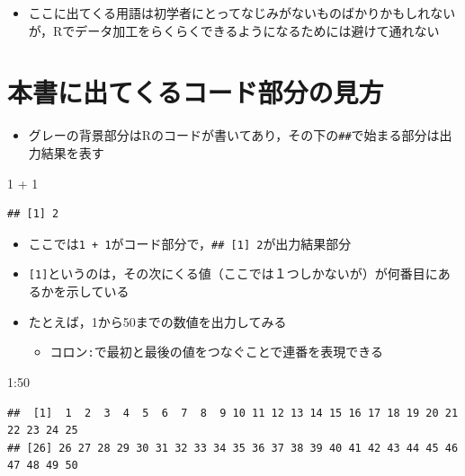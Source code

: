 \documentclass[
  xelatex,ja=standard, b5paper]{bxjsbook}
\newenvironment{Shaded}{\begin{snugshade}}{\end{snugshade}}
\newcommand{\DecValTok}[1]{\textcolor[rgb]{0.00,0.00,0.81}{#1}}
\newcommand{\SpecialCharTok}[1]{\textcolor[rgb]{0.00,0.00,0.00}{#1}}
\providecommand{\tightlist}{%
  \setlength{\itemsep}{0pt}\setlength{\parskip}{0pt}}
\begin{document}
\begin{itemize}
\tightlist
\item
  ここに出てくる用語は初学者にとってなじみがないものばかりかもしれないが，Rでデータ加工をらくらくできるようになるためには避けて通れない
\end{itemize}

\hypertarget{p-howtoread}{%
\section{本書に出てくるコード部分の見方}\label{p-howtoread}}

\begin{itemize}
\tightlist
\item
  グレーの背景部分はRのコードが書いてあり，その下の\texttt{\#\#}で始まる部分は出力結果を表す
\end{itemize}

\begin{Shaded}
\begin{Highlighting}[]
\DecValTok{1} \SpecialCharTok{+} \DecValTok{1}
\end{Highlighting}
\end{Shaded}

\begin{verbatim}
## [1] 2
\end{verbatim}

\begin{itemize}
\tightlist
\item
  ここでは\texttt{1\ +\ 1}がコード部分で，\texttt{\#\#\ {[}1{]}\ 2}が出力結果部分
\item
  \texttt{{[}1{]}}というのは，その次にくる値（ここでは１つしかないが）が何番目にあるかを示している
\item
  たとえば，1から50までの数値を出力してみる

  \begin{itemize}
  \tightlist
  \item
    コロン\texttt{:}で最初と最後の値をつなぐことで連番を表現できる
  \end{itemize}
\end{itemize}

\begin{Shaded}
\begin{Highlighting}[]
\DecValTok{1}\SpecialCharTok{:}\DecValTok{50}
\end{Highlighting}
\end{Shaded}

\begin{verbatim}
##  [1]  1  2  3  4  5  6  7  8  9 10 11 12 13 14 15 16 17 18 19 20 21 22 23 24 25
## [26] 26 27 28 29 30 31 32 33 34 35 36 37 38 39 40 41 42 43 44 45 46 47 48 49 50
\end{verbatim}
\end{document}
